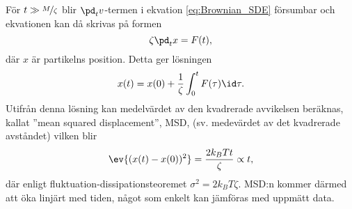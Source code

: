 För $t \gg \nicefrac{M}{\zeta}$ blir $\pd_t v$-termen i ekvation \eqref{eq:Brownian_SDE}  försumbar och ekvationen kan då skrivas på formen
\begin{equation}
    \zeta \pd_t x=F(t),
\end{equation}
där $x$ är partikelns position. Detta ger lösningen
\begin{equation}
    x(t)=x(0)+\frac{1}{\zeta} \int^t_0 F(\tau)\id\tau.
\end{equation}
Utifrån denna lösning kan medelvärdet av den kvadrerade avvikelsen beräknas, kallat ''mean squared displacement'', MSD, (sv. medevärdet av det kvadrerade avståndet) vilken blir 
\begin{equation}\label{eq:MSD_brown}
    \ev{(x(t)-x(0))^2}=\frac{2k_BTt}{\zeta} \propto t,
\end{equation}
där enligt fluktuation-dissipationsteoremet  $\sigma^2=2k_BT\zeta$. MSD:n kommer därmed att öka linjärt med tiden, något som enkelt kan jämföras med uppmätt data.




